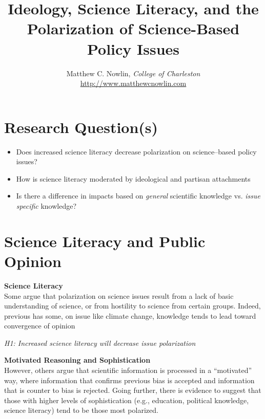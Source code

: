 \documentclass[a0,final]{a0poster}
\title{Ideology, Science Literacy, and the Polarization of Science-Based Policy Issues}
\author{Matthew C. Nowlin, \textit{College of Charleston} \\
\url{http://www.matthewcnowlin.com}}
\begin{document}
\begin{minipage}{\textwidth}
\maketitle
\end{minipage}
\vspace{1cm}

\begin{multicols}{3}
\raggedcolumns

\section*{Research Question(s)}
\begin{itemize}
\item Does increased science literacy decrease polarization on science--based policy issues? 
\item How is science literacy moderated by ideological and partisan attachments 
\item Is there a difference in impacts based on \textit{general} scientific knowledge vs. \textit{issue specific} knowledge? 
\end{itemize}

\section*{Science Literacy and Public Opinion}

\noindent \textbf{Science Literacy} \\

\noindent Some argue that polarization on science issues result from a lack of basic understanding of science, or from hostility to science from certain groups.  Indeed, previous has some, on issue like climate change, knowledge tends to lead toward convergence of opinion 

\begin{center}
  \textit{H1: Increased science literacy will decrease issue polarization}
\end{center}

\noindent \textbf{Motivated Reasoning and Sophistication} \\

\noindent However, others argue that scientific information is processed in a “motivated” way, where information that confirms previous bias is accepted and information that is counter to bias is rejected. Going further, there is evidence to suggest that those with higher levels of sophistication (e.g., education, political knowledge, science literacy) tend to be those most polarized.   


\end{multicols}
\end{document}
